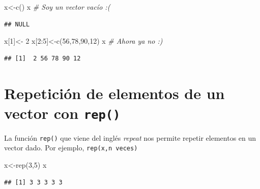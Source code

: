 \documentclass[
]{book}
\newenvironment{Shaded}{\begin{snugshade}}{\end{snugshade}}
\newcommand{\CommentTok}[1]{\textcolor[rgb]{0.56,0.35,0.01}{\textit{#1}}}
\newcommand{\DecValTok}[1]{\textcolor[rgb]{0.00,0.00,0.81}{#1}}
\newcommand{\FunctionTok}[1]{\textcolor[rgb]{0.00,0.00,0.00}{#1}}
\newcommand{\NormalTok}[1]{#1}
\newcommand{\OtherTok}[1]{\textcolor[rgb]{0.56,0.35,0.01}{#1}}
\newcommand{\SpecialCharTok}[1]{\textcolor[rgb]{0.00,0.00,0.00}{#1}}
\begin{document}
\begin{Shaded}
\begin{Highlighting}[]
\NormalTok{x}\OtherTok{\textless{}{-}}\FunctionTok{c}\NormalTok{()}
\NormalTok{x                 }\CommentTok{\# Soy un vector vacío :(}
\end{Highlighting}
\end{Shaded}

\begin{verbatim}
## NULL
\end{verbatim}

\begin{Shaded}
\begin{Highlighting}[]
\NormalTok{x[}\DecValTok{1}\NormalTok{]}\OtherTok{\textless{}{-}} \DecValTok{2}
\NormalTok{x[}\DecValTok{2}\SpecialCharTok{:}\DecValTok{5}\NormalTok{]}\OtherTok{\textless{}{-}}\FunctionTok{c}\NormalTok{(}\DecValTok{56}\NormalTok{,}\DecValTok{78}\NormalTok{,}\DecValTok{90}\NormalTok{,}\DecValTok{12}\NormalTok{)}
\NormalTok{x                 }\CommentTok{\# Ahora ya no :)}
\end{Highlighting}
\end{Shaded}

\begin{verbatim}
## [1]  2 56 78 90 12
\end{verbatim}

\hypertarget{repeticiuxf3n-de-elementos-de-un-vector-con-rep}{%
\section{\texorpdfstring{Repetición de elementos de un vector con \texttt{rep()}}{Repetición de elementos de un vector con rep()}}\label{repeticiuxf3n-de-elementos-de-un-vector-con-rep}}

La función \texttt{rep()} que viene del inglés \emph{repeat} nos permite repetir elementos en un vector dado. Por ejemplo, \texttt{rep(x,n\ veces)}

\begin{Shaded}
\begin{Highlighting}[]
\NormalTok{x}\OtherTok{\textless{}{-}}\FunctionTok{rep}\NormalTok{(}\DecValTok{3}\NormalTok{,}\DecValTok{5}\NormalTok{)}
\NormalTok{x}
\end{Highlighting}
\end{Shaded}

\begin{verbatim}
## [1] 3 3 3 3 3
\end{verbatim}
\end{document}

